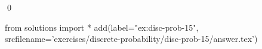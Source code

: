 
\begin{ex} 
  \label{ex:disc-prob-15}
  
  \qed
\end{ex} 
\begin{python0}
from solutions import *
add(label="ex:disc-prob-15",
    srcfilename='exercises/discrete-probability/disc-prob-15/answer.tex') 
\end{python0}
